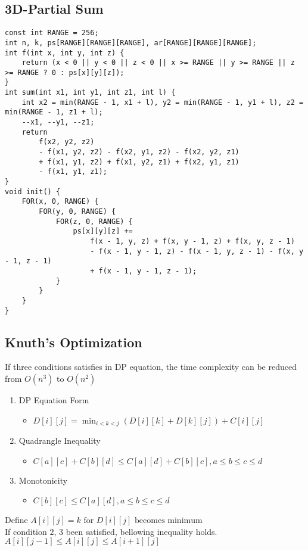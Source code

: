 \documentclass[landscape, 8pt, a4paper, oneside, twocolumn]{extarticle}
\begin{document}
\subsection {3D-Partial Sum}
\begin{verbatim}
const int RANGE = 256;
int n, k, ps[RANGE][RANGE][RANGE], ar[RANGE][RANGE][RANGE];
int f(int x, int y, int z) {
	return (x < 0 || y < 0 || z < 0 || x >= RANGE || y >= RANGE || z >= RANGE ? 0 : ps[x][y][z]);
}
int sum(int x1, int y1, int z1, int l) {
	int x2 = min(RANGE - 1, x1 + l), y2 = min(RANGE - 1, y1 + l), z2 = min(RANGE - 1, z1 + l);
	--x1, --y1, --z1;
	return
		f(x2, y2, z2)
		- f(x1, y2, z2) - f(x2, y1, z2) - f(x2, y2, z1)
		+ f(x1, y1, z2) + f(x1, y2, z1) + f(x2, y1, z1)
		- f(x1, y1, z1);
}
void init() {
	FOR(x, 0, RANGE) {
		FOR(y, 0, RANGE) {
			FOR(z, 0, RANGE) {
				ps[x][y][z] +=
					f(x - 1, y, z) + f(x, y - 1, z) + f(x, y, z - 1)
					- f(x - 1, y - 1, z) - f(x - 1, y, z - 1) - f(x, y - 1, z - 1)
					+ f(x - 1, y - 1, z - 1);
			}
		}
	}
}
\end{verbatim}
\subsection {Knuth's Optimization}
If three conditions satisfies in DP equation, the time complexity can be reduced from $O(n^3)$ to $O(n^2)$
\begin{enumerate}
    \item DP Equation Form
        \begin{itemize}
            \item $D[i][j] = \min_{i < k < j}(D[i][k] + D[k][j]) + C[i][j]$
        \end{itemize}
    \item Quadrangle Inequality
        \begin{itemize}
            \item $C[a][c] + C[b][d] \leq C[a][d] + C[b][c], a \leq b \leq c \leq d$
        \end{itemize}
    \item Monotonicity
        \begin{itemize}
            \item $C[b][c] \leq C[a][d], a \leq b \leq c \leq d$
        \end{itemize}
\end{enumerate}
Define $A[i][j] = k \text{ for } D[i][j] \text{ becomes minimum}$ \\
If condition $2$, $3$ been satisfied, bellowing inequality holds. \\
$A[i][j-1] \leq A[i][j] \leq A[i+1][j]$
\end{document}
